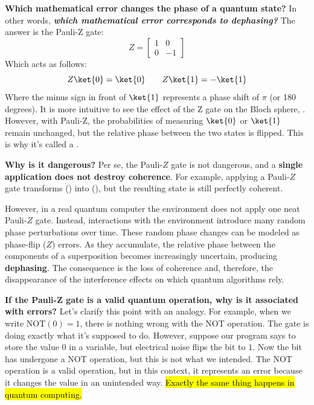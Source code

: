 \highspace
\textcolor{Green3}{ \textbf{Which mathematical error changes the phase of a quantum state?}} In other words, \textbf{\emph{which mathematical error corresponds to dephasing?}} The answer is the Pauli-Z gate:
\begin{equation*}
    Z = \begin{bmatrix}
        1 & 0 \\
        0 & -1
    \end{bmatrix}
\end{equation*}
Which acts as follows:
\begin{equation*}
    Z\ket{0} = \ket{0} \qquad Z\ket{1} = -\ket{1}
\end{equation*}
Where the minus sign in front of $\ket{1}$ represents a phase shift of $\pi$ (or 180 degrees). It is more intuitive to see the effect of the Z gate on the Bloch sphere, . However, with Pauli-Z, the probabilities of measuring $\ket{0}$ or $\ket{1}$ remain unchanged, but the relative phase between the two states is flipped. This is why it's called a .

\highspace
\textcolor{Red2}{ \textbf{Why is it dangerous?}} Per se, the Pauli-$Z$ gate is not dangerous, and a \textbf{single application does not destroy coherence}. For example, applying a Pauli-$Z$ gate transforms (\ket{+}) into (\ket{-}), but the resulting state is still perfectly coherent.

\highspace
However, in a real quantum computer the environment does not apply one neat Pauli-$Z$ gate. Instead, interactions with the environment introduce many random phase perturbations over time. These random phase changes can be modeled as phase-flip ($Z$) errors. As they accumulate, the relative phase between the components of a superposition becomes increasingly uncertain, producing \textbf{dephasing}. The consequence is the loss of coherence and, therefore, the disappearance of the interference effects on which quantum algorithms rely.

\highspace
\textcolor{Green3}{ \textbf{If the Pauli-Z gate is a valid quantum operation, why is it associated with errors?}} Let's clarify this point with an analogy. For example, when we write $\text{NOT}(0) = 1$, there is nothing wrong with the NOT operation. The gate is doing exactly what it's supposed to do. However, suppose our program says to store the value $0$ in a variable, but electrical noise flips the bit to $1$. Now the bit has undergone a NOT operation, but this is not what we intended. The NOT operation is a valid operation, but in this context, it represents an error because it changes the value in an unintended way. \hl{Exactly the same thing happens in quantum computing.}

